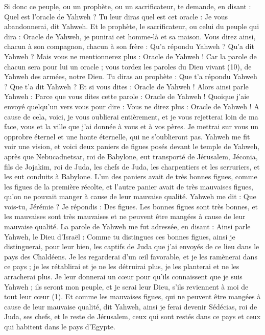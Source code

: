 \begin{multicols}{2}
Si donc ce peuple, ou un prophète, ou un sacrificateur, te demande, en disant : Quel est l’oracle de Yahweh ? Tu leur diras quel est cet oracle : Je vous abandonnerai, dit Yahweh.
Et le prophète, le sacrificateur, ou celui du peuple qui dira : Oracle de Yahweh, je punirai cet homme-là et sa maison.
Vous direz ainsi, chacun à son compagnon, chacun à son frère : Qu'a répondu Yahweh ? Qu'a dit Yahweh ?
Mais vous ne mentionnerez plus : Oracle de Yahweh ! Car la parole de chacun sera pour lui un oracle ; vous tordez les paroles du Dieu vivant\FTNT{} (10), de Yahweh des armées, notre Dieu.
Tu diras au prophète : Que t'a répondu Yahweh ? Que t'a dit Yahweh ?
Et si vous dites : Oracle de Yahweh ! Alors ainsi parle Yahweh : Parce que vous dites cette parole : Oracle de Yahweh ! Quoique j'aie envoyé quelqu’un vers vous pour dire : Vous ne direz plus : Oracle de Yahweh !
A cause de cela, voici, je vous oublierai entièrement, et je vous rejetterai loin de ma face, vous et la ville que j'ai donnée à vous et à vos pères.
Je mettrai sur vous un opprobre éternel et une honte éternelle, qui ne s’oublieront pas.
\VerseOne{}Yahweh me fit voir une vision, et voici deux paniers de figues posés devant le temple de Yahweh, après que Nebucadnetsar, roi de Babylone, eut transporté de Jérusalem, Jéconia, fils de Jojakim, roi de Juda, les chefs de Juda, les charpentiers et les serruriers, et les eut conduits à Babylone.
L'un des paniers avait de très bonnes figues, comme les figues de la première récolte, et l'autre panier avait de très mauvaises figues, qu’on ne pouvait manger à cause de leur mauvaise qualité.
Yahweh me dit : Que vois-tu, Jérémie ? Je répondis : Des figues. Les bonnes figues sont très bonnes, et les mauvaises sont très mauvaises et ne peuvent être mangées à cause de leur mauvaise qualité.
La parole de Yahweh me fut adressée, en disant :
Ainsi parle Yahweh, le Dieu d'Israël : Comme tu distingues ces bonnes figues, ainsi je distinguerai, pour leur bien, les captifs de Juda que j'ai envoyés de ce lieu dans le pays des Chaldéens.
Je les regarderai d’un œil favorable, et je les ramènerai dans ce pays ; je les rétablirai et je ne les détruirai plus, je les planterai et ne les arracherai plus.
Je leur donnerai un cœur pour qu’ils connaissent que je suis Yahweh ; ils seront mon peuple, et je serai leur Dieu, s’ils reviennent à moi de tout leur cœur\FTNT{} (1).
Et comme les mauvaises figues, qui ne peuvent être mangées à cause de leur mauvaise qualité, dit Yahweh, ainsi je ferai devenir Sédécias, roi de Juda, ses chefs, et le reste de Jérusalem, ceux qui sont restés dans ce pays et ceux qui habitent dans le pays d'Egypte.

\end{multicols}
